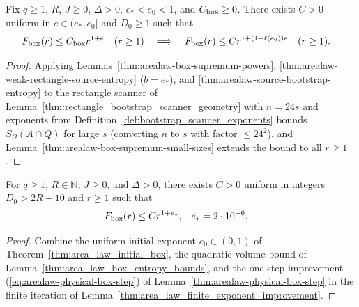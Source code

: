 \begin{lemma}
    \label{thm:arealaw-physical-box-step}
    \leanok
    Fix $q\geq1$, $R$, $J\geq0$, $\Delta>0$, $e_*<e_0<1$, and $C_{\rm box}\geq0$.
    There exists $C>0$ uniform in $e\in(e_*,e_0]$ and $D_0\geq1$ such that
    \begin{align}
        F_{\rm box}(r) & \leq C_{\rm box}r^{1+e}\quad(r\geq1)
        \quad\Longrightarrow\quad
        F_{\rm box}(r)\leq Cr^{1+(1-\ell(e_0))e}\quad(r\geq1).
        \label{eq:arealaw-physical-box-step}
    \end{align}
\end{lemma}
\begin{proof}
    \leanok
    Applying Lemmas~\ref{thm:arealaw-box-supremum-powers},
    \ref{thm:arealaw-weak-rectangle-source-entropy} ($b=e_*$), and
    \ref{thm:arealaw-source-bootstrap-entropy} to the rectangle scanner of
    Lemma~\ref{thm:rectangle_bootstrap_scanner_geometry} with $n=24s$ and exponents from
    Definition~\ref{def:bootstrap_scanner_exponents} bounds $S_\Omega(A\cap Q)$ for large $s$
    (converting $n$ to $s$ with factor $\le24^2$), and Lemma~\ref{thm:arealaw-box-supremum-small-sizes}
    extends the bound to all $r\ge1$.
\end{proof}

\begin{theorem}
    \label{thm:arealaw-physical-box-fixed-exponent}
    \leanok
    For $q\geq1$, $R\in\mathbb N$, $J\geq0$, and $\Delta>0$, there exists $C>0$
    uniform in integers $D_0>2R+10$ and $r\ge1$ such that
    \begin{align}
        F_{\rm box}(r) & \leq Cr^{1+e_*}, & e_* & =2\cdot10^{-6}.
        \label{eq:arealaw-physical-box-fixed-exponent}
    \end{align}
\end{theorem}
\begin{proof}
    \leanok
    Combine the uniform initial exponent $e_0\in(0,1)$ of Theorem~\ref{thm:area_law_initial_box},
    the quadratic volume bound of Lemma~\ref{thm:area_law_box_entropy_bounds}, and the one-step
    improvement (\ref{eq:arealaw-physical-box-step}) of Lemma~\ref{thm:arealaw-physical-box-step}
    in the finite iteration of Lemma~\ref{thm:area_law_finite_exponent_improvement}.
\end{proof}

